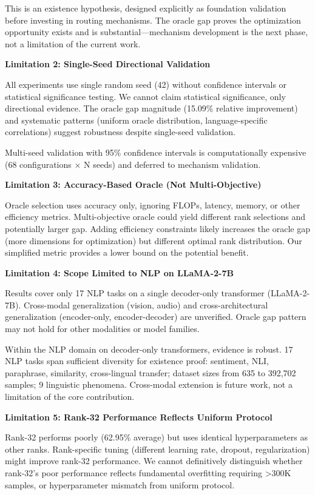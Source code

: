 This is an existence hypothesis, designed explicitly as foundation validation before investing in routing mechanisms. The oracle gap proves the optimization opportunity exists and is substantial—mechanism development is the next phase, not a limitation of the current work.

\textbf{Limitation 2: Single-Seed Directional Validation}

All experiments use single random seed (42) without confidence intervals or statistical significance testing. We cannot claim statistical significance, only directional evidence. The oracle gap magnitude (15.09\% relative improvement) and systematic patterns (uniform oracle distribution, language-specific correlations) suggest robustness despite single-seed validation.

Multi-seed validation with 95\% confidence intervals is computationally expensive (68 configurations × N seeds) and deferred to mechanism validation.

\textbf{Limitation 3: Accuracy-Based Oracle (Not Multi-Objective)}

Oracle selection uses accuracy only, ignoring FLOPs, latency, memory, or other efficiency metrics. Multi-objective oracle could yield different rank selections and potentially larger gap. Adding efficiency constraints likely increases the oracle gap (more dimensions for optimization) but different optimal rank distribution. Our simplified metric provides a lower bound on the potential benefit.

\textbf{Limitation 4: Scope Limited to NLP on LLaMA-2-7B}

Results cover only 17 NLP tasks on a single decoder-only transformer (LLaMA-2-7B). Cross-modal generalization (vision, audio) and cross-architectural generalization (encoder-only, encoder-decoder) are unverified. Oracle gap pattern may not hold for other modalities or model families.

Within the NLP domain on decoder-only transformers, evidence is robust. 17 NLP tasks span sufficient diversity for existence proof: sentiment, NLI, paraphrase, similarity, cross-lingual transfer; dataset sizes from 635 to 392,702 samples; 9 linguistic phenomena. Cross-modal extension is future work, not a limitation of the core contribution.

\textbf{Limitation 5: Rank-32 Performance Reflects Uniform Protocol}

Rank-32 performs poorly (62.95\% average) but uses identical hyperparameters as other ranks. Rank-specific tuning (different learning rate, dropout, regularization) might improve rank-32 performance. We cannot definitively distinguish whether rank-32's poor performance reflects fundamental overfitting requiring >300K samples, or hyperparameter mismatch from uniform protocol.

